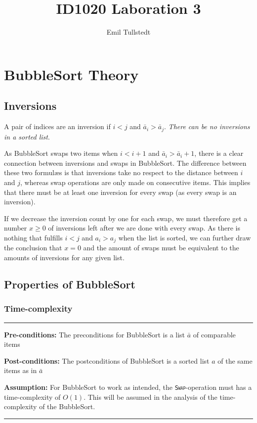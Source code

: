 \documentclass[a4paper,11pt]{article}
\title{ID1020 Laboration 3}
\author{Emil Tullstedt}
\begin{document}
\maketitle

\newpage

\tableofcontents

\newpage

\section{BubbleSort Theory}
\label{sec:bubblesorttheory}

\subsection{Inversions}

A pair of indices are an inversion if $i < j$ and $\bar{a}_i > \bar{a}_j$. \textit{There can be no inversions in a sorted list}.

As BubbleSort swaps two items when $i < i+1$ and $\bar{a}_i > \bar{a}_i+1$, there is a clear connection between inversions and swaps in BubbleSort. The difference between these two formul\ae s is that inversions take no respect to the distance between $i$ and $j$, whereas swap operations are only made on consecutive items. This implies that there must be at least one inversion for every swap (as every swap is an inversion).

If we decrease the inversion count by one for each swap, we must therefore get a number $x \geq 0$ of inversions left after we are done with every swap. As there is nothing that fulfills $i < j$ and $a_i > a_j$ when the list is sorted, we can further draw the conclusion that $x = 0$ and the amount of swaps must be equivalent to the amounts of inversions for any given list.

\subsection{Properties of BubbleSort}

\subsubsection{Time-complexity}

\begin{small}
\vspace{.3em}
\hrule
\vspace{.3em}
\textbf{Pre-conditions:} The preconditions for BubbleSort is a list $\bar{a}$ of comparable items

\textbf{Post-conditions:} The postconditions of BubbleSort is a sorted list $a$ of the same items as in $\bar{a}$

\textbf{Assumption:} For BubbleSort to work as intended, the \texttt{\textsc{Swap}}-operation must has a time-complexity of $O(1)$. This will be assumed in the analysis of the time-complexity of the BubbleSort.

\vspace{.3em}
\hrule
\vspace{.3em}
\end{small}
\end{document}
